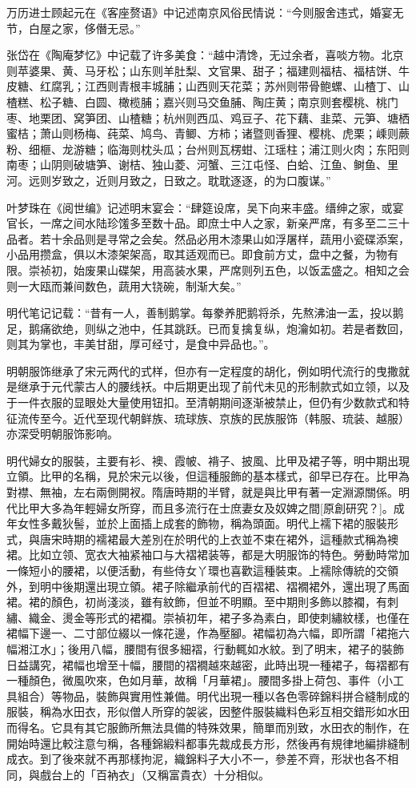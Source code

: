 万历进士顾起元在《客座赘语》中记述南京风俗民情说：“今则服舍违式，婚宴无节，白屋之家，侈僭无忌。”

张岱在《陶庵梦忆》中记载了许多美食：“越中清馋，无过余者，喜啖方物。北京则苹婆果、黄、马牙松；山东则羊肚梨、文官果、甜子；福建则福桔、福桔饼、牛皮糖、红腐乳；江西则青根丰城脯；山西则天花菜；苏州则带骨鲍螺、山楂丁、山楂糕、松子糖、白圆、橄榄脯；嘉兴则马交鱼脯、陶庄黄；南京则套樱桃、桃门枣、地栗团、窝笋团、山楂糖；杭州则西瓜、鸡豆子、花下藕、韭菜、元笋、塘栖蜜桔；萧山则杨梅、莼菜、鸠鸟、青鲫、方柿；诸暨则香狸、樱桃、虎栗；嵊则蕨粉、细榧、龙游糖；临海则枕头瓜；台州则瓦楞蚶、江瑶柱；浦江则火肉；东阳则南枣；山阴则破塘笋、谢桔、独山菱、河蟹、三江屯怪、白蛤、江鱼、鲥鱼、里河。远则岁致之，近则月致之，日致之。耽耽逐逐，的为口腹谋。”

叶梦珠在《阅世编》记述明末宴会：“肆筵设席，吴下向来丰盛。缙绅之家，或宴官长，一席之间水陆珍馐多至数十品。即庶士中人之家，新亲严席，有多至二三十品者。若十余品则是寻常之会矣。然品必用木漆果山如浮屠样，蔬用小瓷碟添案，小品用攒盒，俱以木漆架架高，取其适观而已。即食前方丈，盘中之餐，为物有限。崇祯初，始废果山碟架，用高装水果，严席则列五色，以饭盂盛之。相知之会则一大瓯而兼间数色，蔬用大铙碗，制渐大矣。”

明代笔记记载：“昔有一人，善制鹅掌。每豢养肥鹅将杀，先熬沸油一盂，投以鹅足，鹅痛欲绝，则纵之池中，任其跳跃。已而复擒复纵，炮瀹如初。若是者数回，则其为掌也，丰美甘甜，厚可经寸，是食中异品也。”。

明朝服饰继承了宋元两代的式样，但亦有一定程度的胡化，例如明代流行的曳撒就是继承于元代蒙古人的腰线袄。中后期更出现了前代未见的形制款式如立领，以及于一件衣服的显眼处大量使用钮扣。至清朝期间逐渐被禁止，但仍有少数款式和特征流传至今。近代至现代朝鲜族、琉球族、京族的民族服饰（韩服、琉装、越服）亦深受明朝服饰影响。

明代婦女的服裝，主要有衫、襖、霞帔、褙子、披風、比甲及裙子等，明中期出現立領。比甲的名稱，見於宋元以後，但這種服飾的基本樣式，卻早已存在。比甲為對襟、無袖，左右兩側開衩。隋唐時期的半臂，就是與比甲有著一定淵源關係。明代比甲大多為年輕婦女所穿，而且多流行在士庶妻女及奴婢之間[原創研究？]。成年女性多戴狄髻，並於上面插上成套的飾物，稱為頭面。明代上襦下裙的服裝形式，與唐宋時期的襦裙最大差別在於明代的上衣並不束在裙外，這種款式稱為襖裙。比如立领、宽衣大袖紧袖口与大褶裙装等，都是大明服饰的特色。勞動時常加一條短小的腰裙，以便活動，有些侍女丫環也喜歡這種裝束。上襦除傳統的交領外，到明中後期還出現立領。裙子除繼承前代的百褶裙、褶襉裙外，還出現了馬面裙。裙的顏色，初尚淺淡，雖有紋飾，但並不明顯。至中期則多飾以膝襴，有刺繡、織金、燙金等形式的裙襴。崇禎初年，裙子多為素白，即使刺繡紋樣，也僅在裙幅下邊一、二寸部位綴以一條花邊，作為壓腳。裙幅初為六幅，即所謂「裙拖六幅湘江水」；後用八幅，腰間有很多細褶，行動輒如水紋。到了明末，裙子的裝飾日益講究，裙幅也增至十幅，腰間的褶襉越來越密，此時出現一種裙子，每褶都有一種顏色，微風吹來，色如月華，故稱「月華裙」。腰間多掛上荷包、事件（小工具組合）等物品，裝飾與實用性兼備。明代出現一種以各色零碎錦料拼合縫制成的服裝，稱為水田衣，形似僧人所穿的袈裟，因整件服裝織料色彩互相交錯形如水田而得名。它具有其它服飾所無法具備的特殊效果，簡單而別致，水田衣的制作，在開始時還比較注意勻稱，各種錦緞料都事先裁成長方形，然後再有規律地編排縫制成衣。到了後來就不再那樣拘泥，織錦料子大小不一，參差不齊，形狀也各不相同，與戲台上的「百衲衣」（又稱富貴衣）十分相似。

